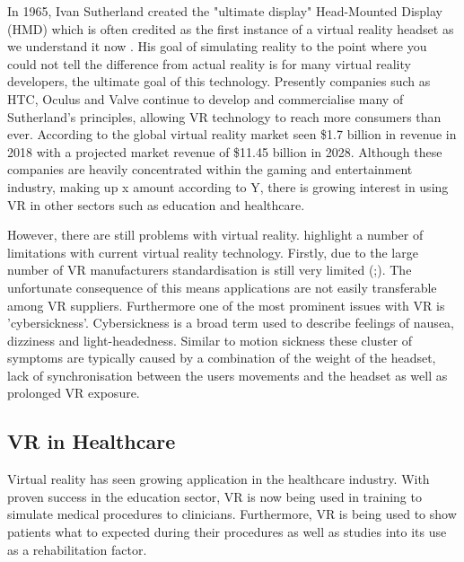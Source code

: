 \documentclass{l4proj}
\begin{document}
In 1965, Ivan Sutherland created the "ultimate display" Head-Mounted Display (HMD) which is often credited as the first instance of a virtual reality headset as we understand it now \citep{VRS2017}. His goal of simulating reality to the point where you could not tell the difference from actual reality is for many virtual reality developers, the ultimate goal of this technology. Presently companies such as HTC, Oculus and Valve continue to develop and commercialise many of Sutherland's principles, allowing VR technology to reach more consumers than ever. According to \citet{Alsop2024} the global virtual reality market seen \$1.7 billion in revenue in 2018 with a projected market revenue of \$11.45 billion in 2028. Although these companies are heavily concentrated within the gaming and entertainment industry, making up x amount according to Y, there is growing interest in using VR in other sectors such as education and healthcare.

However, there are still problems with virtual reality. \citet{HamadJia2022VRChanges} highlight a number of limitations with current virtual reality technology. Firstly, due to the large number of VR manufacturers standardisation is still very limited (\citet{Timmerer2017ImmersiveMedia};\citet{HamadJia2022VRChanges}). The unfortunate consequence of this means applications are not easily transferable among VR suppliers. Furthermore one of the most prominent issues with VR is 'cybersickness'. Cybersickness is a broad term used to describe feelings of nausea, dizziness and light-headedness. Similar to motion sickness these cluster of symptoms are typically caused by a combination of the weight of the headset, lack of synchronisation between the users movements and the headset as well as prolonged VR exposure. 

\subsection{VR in Healthcare}
Virtual reality has seen growing application in the healthcare industry. With proven success in the education sector, VR is now being used in training to simulate medical procedures to clinicians. Furthermore, VR is being used to show patients what to expected during their procedures as well as studies into its use as a rehabilitation factor.
\end{document}
